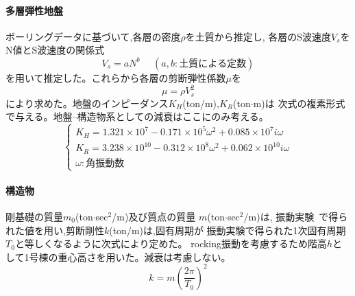 \documentclass[titlepage]{jsarticle}
\def\dfrac#1#2{{\displaystyle\frac{#1}{#2}}}
\begin{document}
\paragraph{多層弾性地盤}
ボーリングデータに基づいて,各層の密度$\rho $を土質から推定し,
各層のS波速度$V_s$をN値とS波速度の関係式
\begin{equation}
V_s = aN^b ~~~~~~(a,b :土質による定数) \label{VN}
\end{equation}
を用いて推定した。これらから各層の剪断弾性係数$\mu $を
\begin{equation}
\mu = \rho V_s^2 \label{mu}
\end{equation}
により求めた。地盤のインピーダンス$K_H$(ton/m),$K_R$(ton$\cdot $m)は
次式の複素形式で与える。地盤--構造物系としての減衰はここにのみ考える。
\begin{equation}\left\{ \begin{array}{l}
K_H = 1.321\times 10^7 - 0.171\times 10^5 \omega ^2 + 0.085\times 10^7 i\omega \\
K_R = 3.238\times 10^{10} - 0.312\times 10^8 \omega ^2 + 0.062\times 10^{10} i\omega \\
\omega : 角振動数
\end{array}\right.\label{inpi}
\end{equation}

\paragraph{構造物}
剛基礎の質量$m_0$(ton$\cdot $sec$^2$/m)及び質点の質量
$m$(ton$\cdot $sec$^2$/m)は,
振動実験~\cite{jikken}で得られた値を用い,剪断剛性$k$(ton/m)は,固有周期が
振動実験で得られた1次固有周期$T_0$と等しくなるように次式により定めた。
rocking振動を考慮するため階高$h$として1号棟の重心高さを用いた。減衰は考慮しない。
\begin{equation}
k = m\left(\dfrac{2\pi }{T_0}\right) ^2 \label{k}
\end{equation}
\end{document}

